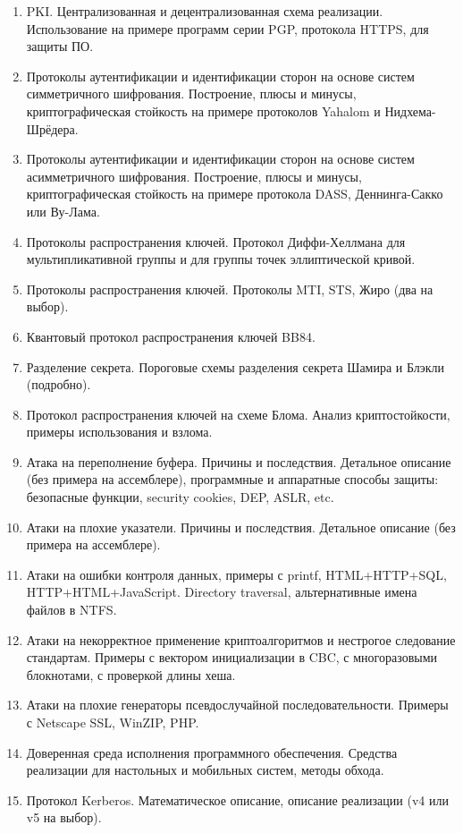 \begin{enumerate}
    \item PKI. Централизованная и децентрализованная схема реализации. Использование на примере программ серии PGP, протокола HTTPS, для защиты ПО.
    \item Протоколы аутентификации и идентификации сторон на основе систем симметричного шифрования. Построение, плюсы и минусы, криптографическая стойкость на примере протоколов Yahalom и Нидхема-Шрёдера.
    \item Протоколы аутентификации и идентификации сторон на основе систем асимметричного шифрования. Построение, плюсы и минусы, криптографическая стойкость на примере протокола DASS, Деннинга-Сакко или Ву-Лама.
    \item Протоколы распространения ключей. Протокол Диффи-Хеллмана для мультипликативной группы и для группы точек эллиптической кривой.
    \item Протоколы распространения ключей. Протоколы MTI, STS, Жиро (два на выбор).
    \item Квантовый протокол распространения ключей BB84.
    \item Разделение секрета. Пороговые схемы разделения секрета Шамира и Блэкли (подробно).
    \item Протокол распространения ключей на схеме Блома. Анализ криптостойкости, примеры использования и взлома.
    \item Атака на переполнение буфера. Причины и последствия. Детальное описание (без примера на ассемблере), программные и аппаратные способы защиты: безопасные функции, security cookies, DEP, ASLR, etc.
    \item Атаки на плохие указатели. Причины и последствия. Детальное описание (без примера на ассемблере).
    \item Атаки на ошибки контроля данных, примеры с printf, HTML+HTTP+SQL, HTTP+HTML+JavaScript. Directory traversal, альтернативные имена файлов в NTFS.
    \item Атаки на некорректное применение криптоалгоритмов и нестрогое следование стандартам. Примеры с вектором инициализации в CBC, с многоразовыми блокнотами, с проверкой длины хеша.
    \item Атаки на плохие генераторы псевдослучайной последовательности. Примеры с Netscape SSL, WinZIP, PHP.
    \item Доверенная среда исполнения программного обеспечения. Средства реализации для настольных и мобильных систем, методы обхода.
    \item Протокол Kerberos. Математическое описание, описание реализации (v4 или v5 на выбор).

\end{enumerate}
